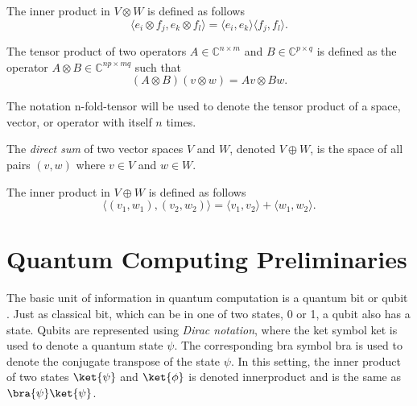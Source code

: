 The inner product in $V \otimes W$ is defined as follows 
\begin{equation*}
  \langle e_i \otimes f_j, e_k \otimes f_l \rangle = \langle e_i, e_k \rangle \langle f_j, f_l \rangle.
\end{equation*}

The tensor product of two operators $A \in \mathbb{C}^{n \times m}$ and $B \in \mathbb{C}^{p \times q}$ is defined as the operator $A \otimes B \in \mathbb{C}^{np \times mq}$ such that
\begin{equation*}
  (A \otimes B)(v \otimes w) = Av \otimes Bw.
\end{equation*}


The notation \gls{n-fold-tensor}  will be used to  denote the tensor product of a space, vector, or operator with itself $n$ times.


\begin{definition}
  The \emph{direct sum} of two vector spaces $V$ and $W$, denoted $V \oplus W$, is the space of all pairs $(v, w)$ where $v \in V$ and $w \in W$.
\end{definition}

The inner product in $V \oplus W$ is defined as follows
\begin{equation*}
  \langle (v_1, w_1), (v_2, w_2) \rangle = \langle v_1, v_2 \rangle + \langle w_1, w_2 \rangle.
\end{equation*}








\section{Quantum Computing Preliminaries} \label{sec:Quantum Computing Preliminaries}

The basic unit of information in quantum computation is a quantum bit or qubit \cite{perdrix2008quantum}. Just as classical bit, which can be in one of two states, 0 or 1, a qubit also has a state. Qubits are represented using \emph{Dirac notation},  where the ket symbol \gls{ket} is used to denote a quantum state $\psi$. The corresponding bra symbol \gls{bra} is used to denote the conjugate transpose of the state $\psi$. In this setting, the inner product of two states $\ket{\psi}$ and $\ket{\phi}$ is denoted \gls{innerproduct} and is the same as $\bra{\psi} \ket{\psi}$. %


